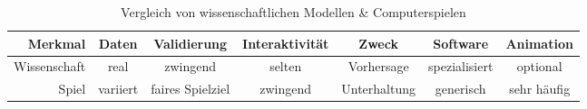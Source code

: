 \begin{table}
  \centering
  \begin{tabular}{r|c|c|c|c|c|c}
    Merkmal      & Daten    & Validierung      & Interaktivität & Zweck        & Software      & Animation   \\
    \hline
    Wissenschaft & real     & zwingend         & selten         & Vorhersage   & spezialisiert & optional    \\
    Spiel        & variiert & faires Spielziel & zwingend       & Unterhaltung & generisch     & sehr häufig \\
  \end{tabular}
  \caption{Vergleich von wissenschaftlichen Modellen \& Computerspielen}
\end{table}